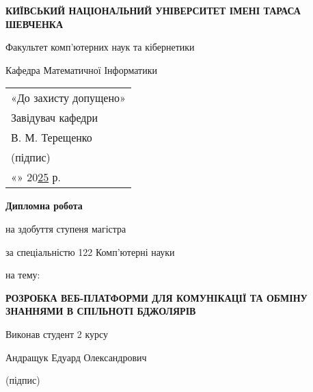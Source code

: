 
\begin{titlepage}
    \centering
    \setlength{\parskip}{0.5em} %

    {\fontsize{14}{16}\selectfont \textbf{КИЇВСЬКИЙ НАЦІОНАЛЬНИЙ УНІВЕРСИТЕТ ІМЕНІ ТАРАСА ШЕВЧЕНКА}\par}
    {\fontsize{12}{14}\selectfont Факультет комп'ютерних наук та кібернетики\par}
    {\fontsize{12}{14}\selectfont Кафедра Математичної Інформатики\par} %

    \begin{flushright}
        \begin{tabular}{l}
        «До захисту допущено» \\
        Завідувач кафедри \\
        В. М. Терещенко \\ %
        \underline{\hspace{4cm}} (підпис) \\
        «\underline{\hspace{1cm}}» \underline{\hspace{4cm}} 20\underline{25} р. %
        \end{tabular}
    \end{flushright}

    \vfill %

    {\fontsize{16}{18}\selectfont \textbf{Дипломна робота}\par}
    {\fontsize{12}{14}\selectfont на здобуття ступеня магістра\par}
    {\fontsize{12}{14}\selectfont за спеціальністю 122 Комп'ютерні науки\par}
    {\fontsize{12}{14}\selectfont на тему:\par}
    {\fontsize{14}{16}\selectfont \textbf{РОЗРОБКА ВЕБ-ПЛАТФОРМИ ДЛЯ КОМУНІКАЦІЇ ТА ОБМІНУ ЗНАННЯМИ В СПІЛЬНОТІ БДЖОЛЯРІВ}\par} %

    \vfill %

    \begin{minipage}[t]{0.9\textwidth} %
        \fontsize{12}{14}\selectfont
        Виконав студент 2 курсу\par %
        Андращук Едуард Олександрович\par %
        \vspace{0.5cm}
        \underline{\hspace{5cm}} (підпис)
        

\end{minipage}
\end{titlepage}
